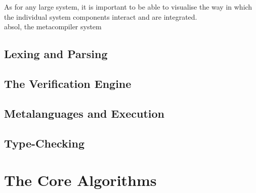 As for any large system, it is important to be able to visualise the way in which the individual system components interact and are integrated. \\

\gls{absol}, the metacompiler system 

\subsection{Lexing and Parsing} %
\label{sub:lexing_and_parsing}


\subsection{The Verification Engine} %
\label{sub:the_verification_engine}


\subsection{Metalanguages and Execution} %
\label{sub:metalanguages_and_execution}


\subsection{Type-Checking} %
\label{sub:type_checking}



\section{The Core Algorithms} %
\label{sec:the_core_algorithms}

